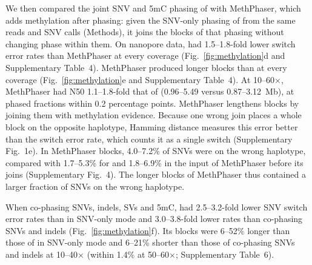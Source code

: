 We then compared the joint SNV and 5mC phasing of \toolname with MethPhaser\cite{fu2024methphaser}, which adds methylation after phasing: given the SNV-only phasing of \toolname from the same reads and SNV calls (Methods), it joins the blocks of that phasing without changing phase within them. On nanopore data, \toolname had 1.5--1.8-fold lower switch error rates than MethPhaser at every coverage (Fig.~\ref{fig:methylation}d and Supplementary Table~4). MethPhaser produced longer blocks than \toolname at every coverage (Fig.~\ref{fig:methylation}e and Supplementary Table~4). At 10--60$\times$, MethPhaser had N50 1.1--1.8-fold that of \toolname (0.96--5.49 versus 0.87--3.12~Mb), at phased fractions within 0.2 percentage points. MethPhaser lengthens blocks by joining them with methylation evidence. Because one wrong join places a whole block on the opposite haplotype, Hamming distance measures this error better than the switch error rate, which counts it as a single switch (Supplementary Fig.~1e). In MethPhaser blocks, 4.0--7.2\% of SNVs were on the wrong haplotype, compared with 1.7--5.3\% for \toolname and 1.8--6.9\% in the input of MethPhaser before its joins (Supplementary Fig.~4). The longer blocks of MethPhaser thus contained a larger fraction of SNVs on the wrong haplotype.

When co-phasing SNVs, indels, SVs and 5mC, \toolname had 2.5--3.2-fold lower SNV switch error rates than \whatshap in SNV-only mode and 3.0--3.8-fold lower rates than \whatshap co-phasing SNVs and indels (Fig.~\ref{fig:methylation}f). Its blocks were 6--52\% longer than those of \whatshap in SNV-only mode and 6--21\% shorter than those of \whatshap co-phasing SNVs and indels at 10--40$\times$ (within 1.4\% at 50--60$\times$; Supplementary Table~6).

